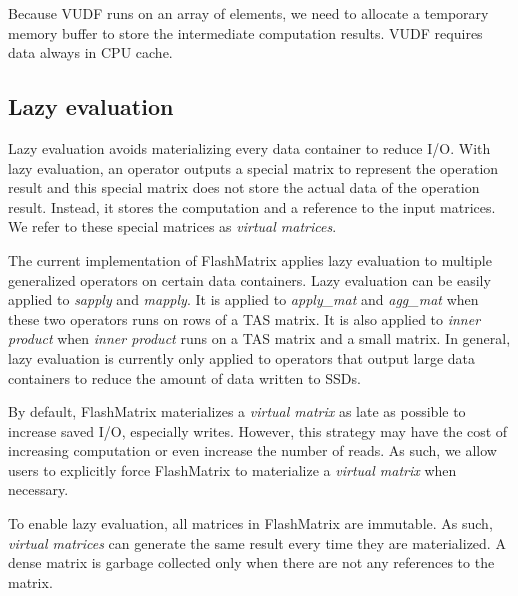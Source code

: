 Because VUDF runs on an array of elements, we need to allocate a temporary
memory buffer to store the intermediate computation results.
VUDF requires data always in CPU cache.

\subsection{Lazy evaluation} \label{sec:lazy_eval}
Lazy evaluation avoids materializing every data container to reduce I/O.
With lazy evaluation, an operator outputs a special matrix to represent
the operation result and this special matrix does not store the actual data of
the operation result. Instead, it stores the computation and a reference to
the input matrices. We refer to these special matrices as
\textit{virtual matrices}.

The current implementation of FlashMatrix applies lazy evaluation to multiple
generalized operators on certain data containers. Lazy evaluation can be easily
applied to \textit{sapply} and \textit{mapply}. It is applied to \textit{apply\_mat}
and \textit{agg\_mat} when these two operators runs on rows of a TAS matrix.
It is also applied to \textit{inner product} when \textit{inner product} runs
on a TAS matrix and a small matrix. In general, lazy evaluation is currently
only applied to operators that output large data containers to reduce the amount
of data written to SSDs.

By default, FlashMatrix materializes a \textit{virtual matrix} as late as
possible to increase saved I/O, especially writes. However, this strategy
may have the cost of increasing computation or even increase the number of
reads. As such, we allow users to explicitly force FlashMatrix to materialize
a \textit{virtual matrix} when necessary.




To enable lazy evaluation, all matrices in FlashMatrix are immutable.
As such, \textit{virtual matrices} can generate the same result every time
they are materialized. A dense matrix is garbage collected only when
there are not any references to the matrix.

